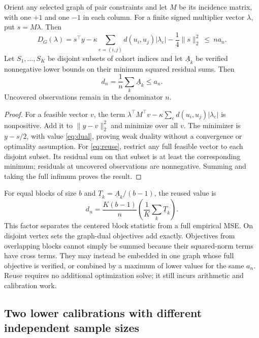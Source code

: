\begin{proposition}
\label{prop:dual}
Orient any selected graph of pair constraints and let $M$ be its incidence
matrix, with one $+1$ and one $-1$ in each column. For a finite signed
multiplier vector $\lambda$, put $s=M\lambda$. Then
\begin{equation}
 D_G(\lambda)
 =s^\top y-\kappa\sum_{e=(i,j)}d(u_i,u_j)|\lambda_e|
       -\frac14\|s\|_2^2
 \ \leq\ n a_n.
 \label{eq:dual}
\end{equation}
Let $S_1,\ldots,S_K$ be disjoint subsets of cohort indices and let
$\underline A_k$ be verified nonnegative lower bounds on their minimum
squared residual sums. Then
\begin{equation}
 d_n=\frac1n\sum_k\underline A_k\leq a_n.
 \label{eq:reuse}
\end{equation}
Uncovered observations remain in the denominator $n$.
\end{proposition}

\begin{proof}
For a feasible vector $v$, the term
$\lambda^\top M^\top v-\kappa\sum_e d(u_i,u_j)|\lambda_e|$ is
nonpositive. Add it to $\|y-v\|_2^2$ and minimize over all $v$.
The minimizer is $y-s/2$, with value \eqref{eq:dual}, proving weak
duality without a convergence or optimality assumption. For
\eqref{eq:reuse}, restrict any full feasible vector to each disjoint
subset. Its residual sum on that subset is at least the corresponding
minimum; residuals at uncovered observations are nonnegative. Summing
and taking the full infimum proves the result.
\end{proof}

For equal blocks of size $b$ and
$\underline T_k=\underline A_k/(b-1)$, the reused value is
\begin{equation}
 d_n=\frac{K(b-1)}n\left(\frac1K\sum_k\underline T_k\right).
 \label{eq:normalization}
\end{equation}
This factor separates the centered block statistic from a full empirical
MSE. On disjoint vertex sets the graph-dual objectives add exactly.
Objectives from overlapping blocks cannot simply be summed because their
squared-norm terms have cross terms. They may instead be embedded in one
graph whose full objective is verified, or combined by a maximum of lower
values for the same $a_n$. Reuse requires no additional optimization solve;
it still incurs arithmetic and calibration work.

\subsection{Two lower calibrations with different independent sample sizes}

